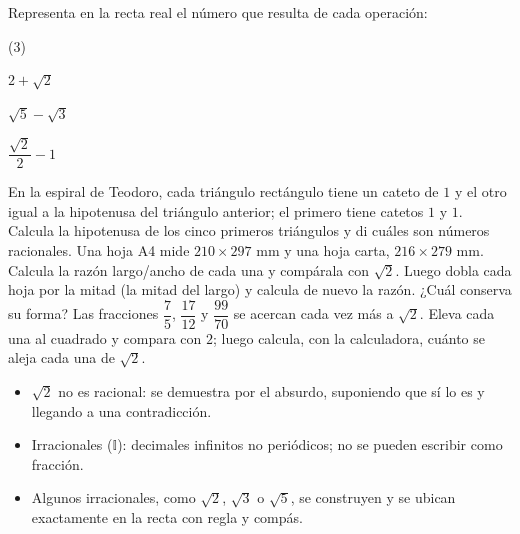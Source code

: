 \documentclass[11pt]{article}
\newcommand{\I}{\mathbb{I}}
\begin{document}
\begin{preguntas}
\pregunta Representa en la recta real el número que resulta de cada operación:
\begin{opciones*}(3)
  \item $2 + \sqrt{2}$
  \item $\sqrt{5} - \sqrt{3}$
  \item $\dfrac{\sqrt{2}}{2} - 1$
\end{opciones*}
\espacio{3cm}
\pregunta En la espiral de Teodoro, cada triángulo rectángulo tiene un
cateto de $1$ y el otro igual a la hipotenusa del triángulo anterior; el
primero tiene catetos $1$ y $1$. Calcula la hipotenusa de los cinco primeros
triángulos y di cuáles son números racionales.
\espacio{3cm}
\pregunta Una hoja A4 mide $210 \times 297$ mm y una hoja carta,
$216 \times 279$ mm. Calcula la razón largo/ancho de cada una y compárala con
$\sqrt{2}$. Luego dobla cada hoja por la mitad (la mitad del largo) y calcula
de nuevo la razón. ¿Cuál conserva su forma?
\espacio{3.5cm}
\pregunta Las fracciones $\dfrac{7}{5}$, $\dfrac{17}{12}$ y $\dfrac{99}{70}$
se acercan cada vez más a $\sqrt{2}$. Eleva cada una al cuadrado y compara
con $2$; luego calcula, con la calculadora, cuánto se aleja cada una de
$\sqrt{2}$.
\espacio{3.5cm}
\end{preguntas}

\begin{resumen}
\begin{itemize}
  \item $\sqrt{2}$ no es racional: se demuestra por el absurdo, suponiendo
        que sí lo es y llegando a una contradicción.
  \item Irracionales ($\I$): decimales infinitos no periódicos; no se pueden
        escribir como fracción.
  \item Algunos irracionales, como $\sqrt{2}$, $\sqrt{3}$ o $\sqrt{5}$, se
        construyen y se ubican exactamente en la recta con regla y compás.
\end{itemize}
\end{resumen}
\end{document}
